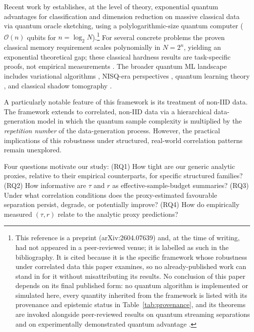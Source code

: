 \documentclass[sensors,article,submit,pdftex,moreauthors]{Definitions/mdpi}
\newcommand{\bigO}{\mathcal{O}}
\providecommand{\DIFadd}[1]{{\protect\color{blue}#1}} %
\providecommand{\DIFdel}[1]{} %
\providecommand{\DIFaddbegin}{} %
\providecommand{\DIFaddend}{} %
\providecommand{\DIFdelbegin}{} %
\providecommand{\DIFdelend}{} %
\begin{document}
Recent work by \citet{zhao2026exponential} \DIFdelbegin \DIFdel{shows that quantum oracle sketching achieves }\DIFdelend \DIFaddbegin \DIFadd{establishes, at the level of theory, }\DIFaddend exponential quantum advantages for classification and dimension reduction on massive classical data \DIFaddbegin \DIFadd{via quantum oracle sketching}\DIFaddend , using a polylogarithmic-size quantum computer ($\bigO(n)$ qubits for $n = \log_2 N$).\DIFaddbegin \footnote{\DIFadd{This reference is a preprint (arXiv:2604.07639) and, at the time of writing, had not appeared in a peer-reviewed venue; it is labelled as such in the bibliography. It is cited because it is the specific framework whose robustness under correlated data this paper examines, so no already-published work can stand in for it without misattributing its results. No conclusion of this paper depends on its final published form: no quantum algorithm is implemented or simulated here, every quantity inherited from the framework is listed with its provenance and epistemic status in Table~\ref{tab:provenance}, and its theorems are invoked alongside peer-reviewed results on quantum streaming separations }\citep{kallaugher2021streaming, kallaugher2024maxdicut, kallaugher2025designquantum} \DIFadd{and on experimentally demonstrated quantum advantage }\citep{huang2022experiments}\DIFadd{.}} \DIFaddend For several concrete problems the \DIFaddbegin \DIFadd{proven }\DIFaddend classical memory requirement scales polynomially in $N = 2^n$, yielding an exponential \DIFdelbegin \DIFdel{gap; the }\DIFdelend \DIFaddbegin \DIFadd{theoretical gap; these }\DIFaddend classical hardness results are task-specific \DIFaddbegin \DIFadd{proofs, not empirical measurements }\DIFaddend \citep{harrow2009hhl, havlicek2019qkernels, schuld2021encoding, biamonte2017qml}. The broader quantum ML landscape includes variational algorithms \citep{cerezo2021variational}, NISQ-era perspectives \citep{preskill2018nisq}, quantum learning theory \citep{schuld2018supervised}, and classical shadow tomography \citep{huang2020shadows}.

A particularly notable feature of this framework is its treatment of non\nobreakdash-IID data. The framework extends to correlated, non\nobreakdash-IID data via a hierarchical data-generation model in which the quantum sample complexity is multiplied by the \emph{repetition number} of the data-generation process. However, the practical implications of this robustness under structured, real-world correlation patterns remain unexplored.

Four questions motivate our study: (RQ1) How tight are \DIFdelbegin \DIFdel{the generic robustness guarantees }\DIFdelend \DIFaddbegin \DIFadd{our generic analytic proxies, relative to their empirical counterparts, }\DIFaddend for specific structured families? (RQ2) How informative are $\tau$ and $r$ as \DIFdelbegin \DIFdel{accuracy predictors}\DIFdelend \DIFaddbegin \DIFadd{effective-sample-budget summaries}\DIFaddend ? (RQ3) Under what correlation conditions does the proxy-estimated favourable separation persist, degrade, or potentially improve? (RQ4) How do empirically measured $(\tau, r)$ relate to the analytic proxy predictions?
\end{document}
